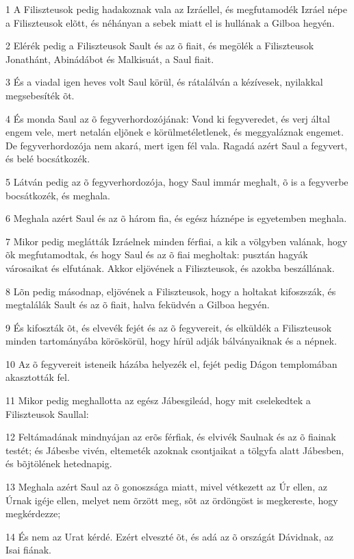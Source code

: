 \par 1 A Filiszteusok pedig hadakoznak vala az Izráellel, és megfutamodék Izráel népe a Filiszteusok elõtt, és néhányan a sebek miatt el is hullának a Gilboa hegyén.
\par 2 Elérék pedig a Filiszteusok Sault és az õ fiait, és megölék a Filiszteusok Jonathánt, Abinádábot és Malkisuát, a Saul fiait.
\par 3 És a viadal igen heves volt Saul körül, és rátalálván a kézívesek, nyilakkal megsebesíték õt.
\par 4 És monda Saul az õ fegyverhordozójának: Vond ki fegyveredet, és verj által engem vele, mert netalán eljõnek e körülmetéletlenek, és meggyaláznak engemet. De fegyverhordozója nem akará, mert igen fél vala. Ragadá azért Saul a fegyvert, és belé bocsátkozék.
\par 5 Látván pedig az õ fegyverhordozója, hogy Saul immár meghalt, õ is a fegyverbe bocsátkozék, és meghala.
\par 6 Meghala azért Saul és az õ három fia, és egész háznépe is egyetemben meghala.
\par 7 Mikor pedig meglátták Izráelnek minden férfiai, a kik a völgyben valának, hogy õk megfutamodtak, és hogy Saul és az õ fiai megholtak: pusztán hagyák városaikat és elfutának. Akkor eljövének a Filiszteusok, és azokba beszállának.
\par 8 Lõn pedig másodnap, eljövének a Filiszteusok, hogy a holtakat kifoszszák, és megtalálák Sault és az õ fiait, halva feküdvén a Gilboa hegyén.
\par 9 És kifoszták õt, és elvevék fejét és az õ fegyvereit, és elküldék a Filiszteusok minden tartományába köröskörül, hogy hírül adják bálványaiknak és a népnek.
\par 10 Az õ fegyvereit isteneik házába helyezék el, fejét pedig Dágon templomában akasztották fel.
\par 11 Mikor pedig meghallotta az egész Jábesgileád, hogy mit cselekedtek a Filiszteusok Saullal:
\par 12 Feltámadának mindnyájan az erõs férfiak, és elvivék Saulnak és az õ fiainak testét; és Jábesbe vivén, eltemeték azoknak csontjaikat a tölgyfa alatt Jábesben, és bõjtölének hetednapig.
\par 13 Meghala azért Saul az õ gonoszsága miatt, mivel vétkezett az Úr ellen, az Úrnak igéje ellen, melyet nem õrzött meg, sõt az ördöngöst is megkereste, hogy megkérdezze;
\par 14 És nem az Urat kérdé. Ezért elveszté õt, és adá az õ országát Dávidnak, az Isai fiának.

